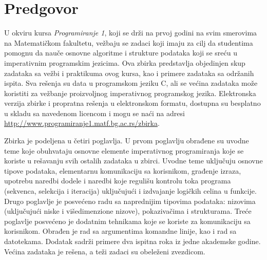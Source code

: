 \chapter*{Predgovor}

U okviru kursa {\em Programiranje 1}, koji se drži na prvoj godini na svim smerovima na Matematičkom fakultetu, vežbaju se zadaci koji imaju za cilj da studentima pomognu da nauče osnovne algoritme i strukture podataka koji se sreću u imperativnim programskim jezicima. Ova zbirka predstavlja objedinjen skup zadataka sa vežbi i praktikuma ovog kursa, kao i primere zadataka sa održanih ispita. Sva rešenja su data u programskom jeziku C, ali se većina zadataka može koristiti za vežbanje proizvoljnog imperativnog programskog jezika.
Elektronska verzija zbirke i propratna rešenja u elektronskom formatu, dostupna su besplatno u skladu sa navedenom licencom i mogu se naći na adresi \url{http://www.programiranje1.matf.bg.ac.rs/zbirka}.

Zbirka je podeljena u četiri poglavlja. U prvom poglavlju obrađene su uvodne teme koje obuhvataju osnovne elemente imperativnog programiranja koje se koriste u rešavanju svih ostalih zadataka u zbirci. Uvodne teme uključuju osnovne tipove podataka, elementarnu komunikaciju sa korisnikom, građenje izraza, upotrebu naredbi dodele i naredbi koje regulišu kontrolu toka programa (sekvenca, selekcija i iteracija) uključujući i izdvajanje logičkih celina u funkcije. Drugo poglavlje je posvećeno radu sa naprednijim tipovima podataka: nizovima (uključujući niske i višedimenzione nizove), pokazivačima i strukturama. Treće poglavlje posvećeno je dodatnim tehnikama koje se koriste za komunikaciju sa korisnikom. Obrađen je rad sa argumentima komandne linije, kao i rad sa datotekama. Dodatak sadrži primere dva ispitna roka iz jedne akademske godine. Većina zadataka je rešena, a teži zadaci su obeleženi zvezdicom.

